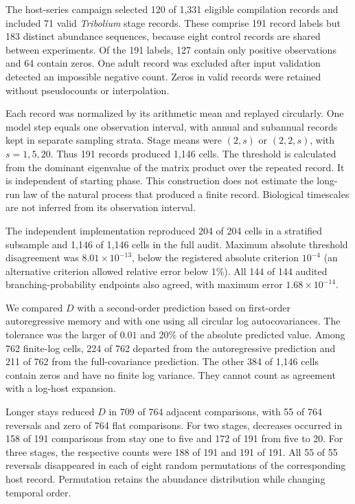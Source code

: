 The host-series campaign selected 120 of 1,331 eligible compilation records
and included 71 valid \textit{Tribolium} stage records. These comprise 191
record labels but 183 distinct abundance sequences, because eight control
records are shared between experiments. Of the 191 labels, 127 contain
only positive observations and 64 contain zeros. One adult record was
excluded after input validation detected an impossible negative count.
Zeros in valid records were retained without pseudocounts or interpolation.

Each record was normalized by its arithmetic mean and replayed circularly.
One model step equals one observation interval, with annual and subannual
records kept in separate sampling strata. Stage means were $(2,s)$ or
$(2,2,s)$, with $s=1,5,20$. Thus 191 records produced 1,146 cells.
The threshold is calculated from the dominant eigenvalue of the matrix
product over the repeated record. It is independent of starting phase.
This construction does not estimate the long-run law of the natural
process that produced a finite record. Biological timescales are not
inferred from its observation interval.

The independent implementation reproduced 204 of 204 cells in a stratified
subsample and 1,146 of 1,146 cells in the full audit. Maximum absolute
threshold disagreement was $8.01\times10^{-13}$, below the registered
absolute criterion $10^{-4}$ (an alternative criterion allowed relative
error below 1\%). All 144 of 144 audited branching-probability endpoints
also agreed, with maximum error $1.68\times10^{-14}$.

We compared $D$ with a second-order prediction based on first-order
autoregressive memory and with one using all circular log autocovariances.
The tolerance was the larger of $0.01$ and 20\% of the absolute predicted
value. Among 762 finite-log cells, 224 of
762 departed from the autoregressive prediction and 211 of 762 from the
full-covariance prediction. The other 384 of 1,146 cells contain zeros
and have no finite log variance. They cannot count as agreement with a
log-host expansion.

Longer stays reduced $D$ in 709 of 764 adjacent comparisons, with 55 of
764 reversals and zero of 764 flat comparisons. For two stages, decreases
occurred in 158 of 191 comparisons from stay one to five and 172 of 191
from five to 20. For three stages, the respective counts were 188 of 191
and 191 of 191. All 55 of 55 reversals disappeared in each of eight
random permutations of the corresponding host record. Permutation retains
the abundance distribution while changing temporal order.

